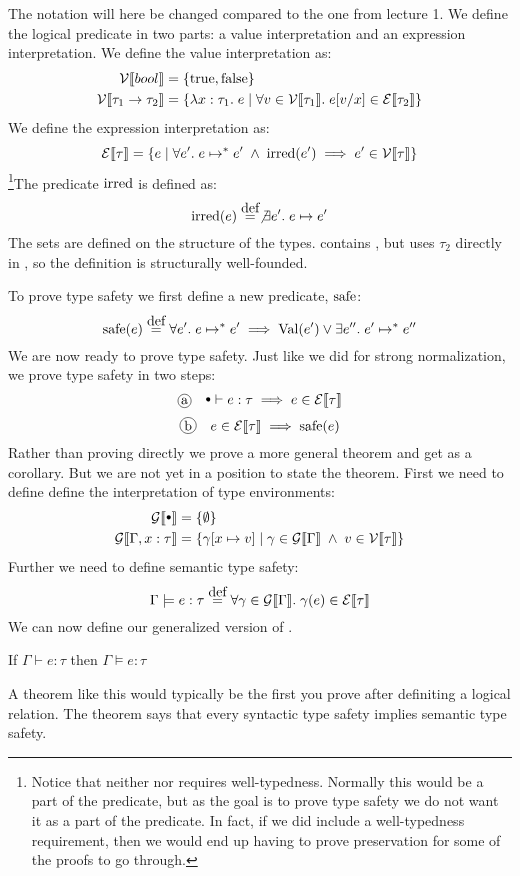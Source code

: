 The notation will here be changed compared to the one from lecture 1. We define the logical predicate in two parts: a value interpretation and an expression interpretation. We define the value interpretation as:
\begin{align*}
  \mathcal{V}\llbracket bool \rrbracket & = \{ \text{true}, \text{false} \}\\
  \mathcal{V}\llbracket  \tau_1 \rightarrow \tau_2 \rrbracket & = \{\lambda x : \tau_1 . \; e \; | \; \forall v \in \mathcal{V}\llbracket \tau_1 \rrbracket.\; e [v/x] \in \mathcal{E}\llbracket \tau_2 \rrbracket\}
\end{align*}
We define the expression interpretation as:
\[
  \mathcal{E}\llbracket \tau \rrbracket = \{e \; | \; \forall e'. \; e \mapsto^{*} e' \; \wedge \; \operatorname{irred}(e') \implies e' \in \mathcal{V}\llbracket \tau \rrbracket \}
\]
\footnote{Notice that neither \vpred{\tau} nor \epred{\tau} requires well-typedness. Normally this would be a part of the predicate, but as the goal is to prove type safety we do not want it as a part of the predicate. In fact, if we did include a well-typedness requirement, then we would end up having to prove preservation for some of the proofs to go through.}The predicate $\operatorname{irred}$ is defined as:
\[
  \irred(e) \eqdef \not\exists e'. \; e \evalto e'
\]
The sets are defined on the structure of the types.  contains , but  uses $\tau_2$ directly in , so the definition is structurally well-founded. 

To prove type safety we first define a new predicate, $\operatorname{safe}$:
\[
  \safe(e) \eqdef \forall e' . \; e \evaltos e' \implies \val(e') \vee \exists e
''. \; e' \evaltos e''
\]
We are now ready to prove type safety. Just like we did for strong normalization, we prove type safety in two steps:
\[
  \circled{a} \quad \mtenv \vdash e : \tau \implies e \in \epred{\tau}
\]
\[
  \circled{b} \quad e \in \epred{\tau} \implies \safe(e)
\]
Rather than proving  directly we prove a more general theorem and get  as a corollary. But we are not yet in a position to state the theorem. First we need to define define the interpretation of type environments:
\begin{align*}
  \gpred{\mtenv} & = \{ \emptyset \} \\
  \gpred{\Gamma,x:\tau} & = \{\gamma[x \mapsto v] \vbar 
    \gamma \in \gpred{\Gamma} \pand 
    v \in \vpred{\tau}\}
\end{align*}
Further we need to define semantic type safety:
\[
  \Gamma \models e : \tau \eqdef \forall \gamma \in \gpred{\Gamma} . \; \gamma(e) \in \epred{\tau}
\]
We can now define our generalized version of . 
\begin{btypesafety}
  If $\Gamma \vdash e : \tau$ then $\Gamma \models e : \tau$
\end{btypesafety}
A theorem like this would typically be the first you prove after definiting a logical relation. The theorem says that every syntactic type safety implies semantic type safety. 

